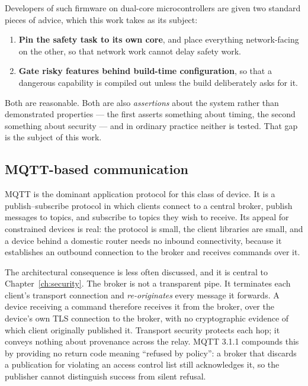 Developers of such firmware on dual-core microcontrollers are given two standard pieces of
advice, which this work takes as its subject:

\begin{enumerate}[leftmargin=1.6em,itemsep=4pt]
  \item \textbf{Pin the safety task to its own core}, and place everything network-facing on
        the other, so that network work cannot delay safety work.
  \item \textbf{Gate risky features behind build-time configuration}, so that a dangerous
        capability is compiled out unless the build deliberately asks for it.
\end{enumerate}

Both are reasonable. Both are also \emph{assertions} about the system rather than
demonstrated properties — the first asserts something about timing, the second something about
security — and in ordinary practice neither is tested. That gap is the subject of this work.

\subsection{MQTT-based communication}

MQTT is the dominant application protocol for this class of device. It is a publish--subscribe
protocol in which clients connect to a central broker, publish messages to topics, and
subscribe to topics they wish to receive. Its appeal for constrained devices is real: the
protocol is small, the client libraries are small, and a device behind a domestic router needs
no inbound connectivity, because it establishes an outbound connection to the broker and
receives commands over it.

The architectural consequence is less often discussed, and it is central to
Chapter~\ref{ch:security}. The broker is not a transparent pipe. It terminates each client's
transport connection and \emph{re-originates} every message it forwards. A device receiving a
command therefore receives it from the broker, over the device's own TLS connection to the
broker, with no cryptographic evidence of which client originally published it. Transport
security protects each hop; it conveys nothing about provenance across the relay. MQTT 3.1.1
compounds this by providing no return code meaning ``refused by policy'': a broker that
discards a publication for violating an access control list still acknowledges it, so the
publisher cannot distinguish success from silent refusal.

